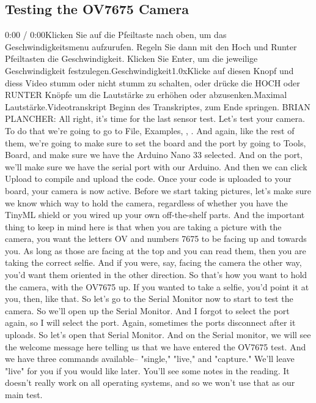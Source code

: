 \subsection{Testing the OV7675 Camera}

0:00 / 0:00Klicken Sie auf die Pfeiltaste nach oben, um das Geschwindigkeitsmenu aufzurufen. Regeln Sie dann mit den Hoch und Runter Pfeiltasten die Geschwindigkeit. Klicken Sie Enter, um die jeweilige Geschwindigkeit festzulegen.Geschwindigkeit1.0xKlicke auf diesen Knopf und diess Video stumm oder nicht stumm zu schalten, oder drücke die HOCH oder RUNTER Knöpfe um die Lautstärke zu erhöhen oder abzusenken.Maximal Lautstärke.Videotranskript
Beginn des Transkriptes, zum Ende springen.
BRIAN PLANCHER: All right, it's time for the last sensor test.
Let's test your camera.
To do that we're going to go to File, Examples, , .
And again, like the rest of them, we're going
to make sure to set the board and the port by going to Tools, Board,
and make sure we have the Arduino Nano 33 selected.
And on the port, we'll make sure we have the serial port with our Arduino.
And then we can click Upload to compile and upload the code.
Once your code is uploaded to your board, your camera is now active.
Before we start taking pictures, let's make
sure we know which way to hold the camera,
regardless of whether you have the TinyML shield
or you wired up your own off-the-shelf parts.
And the important thing to keep in mind here
is that when you are taking a picture with the camera,
you want the letters OV and numbers 7675 to be facing up and towards you.
As long as those are facing at the top and you can read them,
then you are taking the correct selfie.
And if you were, say, facing the camera the other way,
you'd want them oriented in the other direction.
So that's how you want to hold the camera, with the OV7675 up.
If you wanted to take a selfie, you'd point it at you, then, like that.
So let's go to the Serial Monitor now to start to test the camera.
So we'll open up the Serial Monitor.
And I forgot to select the port again, so I will select the port.
Again, sometimes the ports disconnect after it uploads.
So let's open that Serial Monitor.
And on the Serial monitor, we will see the welcome message here
telling us that we have entered the OV7675 test.
And we have three commands available-- "single," "live," and "capture."
We'll leave "live" for you if you would like later.
You'll see some notes in the reading.
It doesn't really work on all operating systems,
and so we won't use that as our main test.
